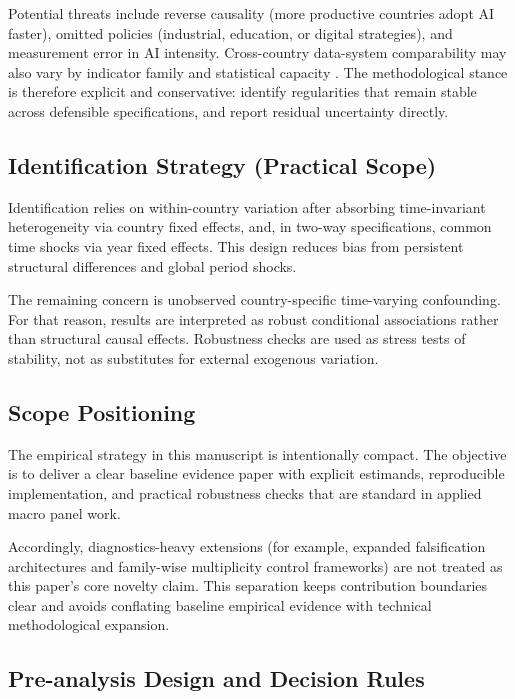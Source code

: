 Potential threats include reverse causality (more productive countries adopt AI faster), omitted policies (industrial, education, or digital strategies), and measurement error in AI intensity. Cross-country data-system comparability may also vary by indicator family and statistical capacity \cite{worldbank2021wdr,worldbankWDI2024}. The methodological stance is therefore explicit and conservative: identify regularities that remain stable across defensible specifications, and report residual uncertainty directly.

\subsection{Identification Strategy (Practical Scope)}

Identification relies on within-country variation after absorbing time-invariant heterogeneity via country fixed effects, and, in two-way specifications, common time shocks via year fixed effects. This design reduces bias from persistent structural differences and global period shocks.

The remaining concern is unobserved country-specific time-varying confounding. For that reason, results are interpreted as robust conditional associations rather than structural causal effects. Robustness checks are used as stress tests of stability, not as substitutes for external exogenous variation.

\subsection{Scope Positioning}

The empirical strategy in this manuscript is intentionally compact. The objective is to deliver a clear baseline evidence paper with explicit estimands, reproducible implementation, and practical robustness checks that are standard in applied macro panel work.

Accordingly, diagnostics-heavy extensions (for example, expanded falsification architectures and family-wise multiplicity control frameworks) are not treated as this paper's core novelty claim. This separation keeps contribution boundaries clear and avoids conflating baseline empirical evidence with technical methodological expansion.

\subsection{Pre-analysis Design and Decision Rules}

